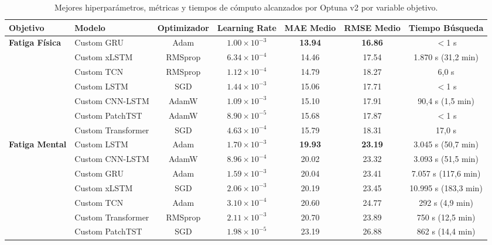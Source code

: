 \documentclass[12pt, a4paper]{article}
\begin{document}
\begin{table}[H]
\centering
\caption{Mejores hiperparámetros, métricas y tiempos de cómputo alcanzados por Optuna v2 por variable objetivo.}
\label{tab:optuna_v2_resumen}
\small
\begin{tabular}{@{}llccccc@{}}
\toprule
\textbf{Objetivo} & \textbf{Modelo} & \textbf{Optimizador} & \textbf{Learning Rate} & \textbf{MAE Medio} & \textbf{RMSE Medio} & \textbf{Tiempo Búsqueda} \\
\midrule
\multirow{7}{*}{\textbf{Fatiga Física}} 
& Custom GRU & Adam & $1.00 \times 10^{-3}$ & \textbf{13.94} & \textbf{16.86} & $<$1 s \\
& Custom xLSTM & RMSprop & $6.34 \times 10^{-4}$ & 14.46 & 17.54 & 1.870 s (31,2 min) \\
& Custom TCN & RMSprop & $1.12 \times 10^{-4}$ & 14.79 & 18.27 & 6,0 s \\
& Custom LSTM & SGD & $1.44 \times 10^{-3}$ & 15.06 & 17.71 & $<$1 s \\
& Custom CNN-LSTM & AdamW & $1.09 \times 10^{-3}$ & 15.10 & 17.91 & 90,4 s (1,5 min) \\
& Custom PatchTST & AdamW & $8.90 \times 10^{-5}$ & 15.68 & 17.87 & $<$1 s \\
& Custom Transformer & SGD & $4.63 \times 10^{-4}$ & 15.79 & 18.31 & 17,0 s \\
\midrule
\multirow{7}{*}{\textbf{Fatiga Mental}} 
& Custom LSTM & Adam & $1.70 \times 10^{-3}$ & \textbf{19.93} & \textbf{23.19} & 3.045 s (50,7 min) \\
& Custom CNN-LSTM & AdamW & $8.96 \times 10^{-4}$ & 20.02 & 23.32 & 3.093 s (51,5 min) \\
& Custom GRU & Adam & $1.59 \times 10^{-3}$ & 20.04 & 23.41 & 7.057 s (117,6 min) \\
& Custom xLSTM & SGD & $2.06 \times 10^{-3}$ & 20.19 & 23.45 & 10.995 s (183,3 min) \\
& Custom TCN & Adam & $3.10 \times 10^{-4}$ & 20.60 & 24.77 & 292 s (4,9 min) \\
& Custom Transformer & RMSprop & $2.11 \times 10^{-3}$ & 20.70 & 23.89 & 750 s (12,5 min) \\
& Custom PatchTST & SGD & $1.98 \times 10^{-5}$ & 23.19 & 26.88 & 862 s (14,4 min) \\
\bottomrule
\end{tabular}
\end{table}
\end{document}
